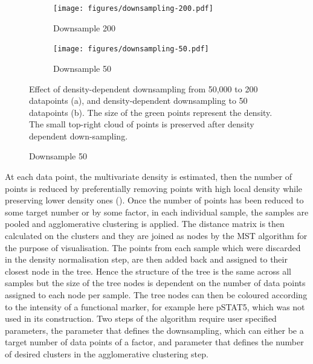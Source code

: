 \hspace{-2cm}
\begin{figure}[h]
\centering
\begin{subfigure}[c]{.45\linewidth}
    \centering
  \texttt{[image: figures/downsampling-200.pdf]}
\caption{Downsample 200}
\end{subfigure}
\begin{subfigure}[c]{.45\linewidth}
    \centering
  \texttt{[image: figures/downsampling-50.pdf]}
  \caption{Downsample 50}
\end{subfigure}
{
Effect of density-dependent downsampling from 50,000 to 200 datapoints (a), and density-dependent downsampling to 50 datapoints (b). 
The size of the green points represent the density.
The small top-right cloud of points is preserved after density dependent down-sampling.
}
\end{figure}

At each data point, the multivariate density is estimated, then the number of points is reduced by preferentially removing 
points with high local density while preserving lower density ones ().
Once the number of points has been reduced to some target number or by some factor, in each individual sample,
the samples are pooled and agglomerative clustering is applied.
The distance matrix is then calculated on the clusters and they are joined as nodes by the \acrfull{MST} algorithm for the purpose of visualisation.
The points from each sample which were discarded in the density normalisation step, are then added back and assigned to their closest node in the tree.
Hence the structure of the tree is the same across all samples but the size of the tree nodes 
is dependent on the number of data points assigned to each node per sample.
The tree nodes can then be coloured according to the intensity of a functional marker, for example here pSTAT5,
which was not used in its construction.
Two steps of the algorithm require user specified parameters, the parameter that defines the downsampling,
which can either be a target number of data points of a factor, and parameter that defines the number of desired clusters
in the agglomerative clustering step.

